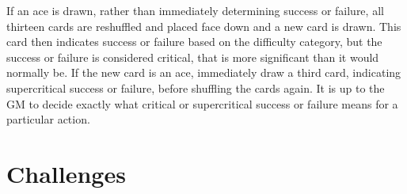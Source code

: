 \documentclass{report}
\begin{document}
If an ace is drawn, rather than immediately determining success or failure, all thirteen cards are reshuffled and placed
face down and a new card is drawn. This card then indicates success or failure based on the difficulty category, but the
success or failure is considered critical, that is more significant than it would normally be. If the new card is an ace,
immediately draw a third card, indicating supercritical success or failure, before shuffling the cards again. It is up to
the GM to decide exactly what critical or supercritical success or failure means for a particular action.

\section{Challenges}
\end{document}

